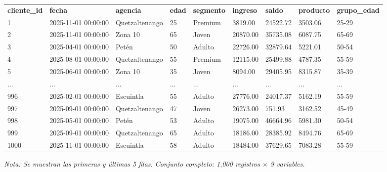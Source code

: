 

\begin{table}[htbp]

\centering

\begin{adjustbox}{max width=\textwidth}

\begin{tabular}{lllllllll}

\rowcolor{ThemeBackground}
\rule{0pt}{0.45cm}
\textcolor{ThemeGold}{\bfseries cliente\_id} & \textcolor{ThemeGold}{\bfseries fecha} & \textcolor{ThemeGold}{\bfseries agencia} & \textcolor{ThemeGold}{\bfseries edad} & \textcolor{ThemeGold}{\bfseries segmento} & \textcolor{ThemeGold}{\bfseries ingreso} & \textcolor{ThemeGold}{\bfseries saldo} & \textcolor{ThemeGold}{\bfseries producto} & \textcolor{ThemeGold}{\bfseries grupo\_edad} \\

1 & 2025-11-01 00:00:00 & Quetzaltenango & 25 & Premium & 3819.00 & 24522.72 & 3503.06 & 25-29 \\
2 & 2025-11-01 00:00:00 & Zona 10 & 65 & Joven & 20870.00 & 35735.08 & 6087.75 & 65-69 \\
3 & 2025-04-01 00:00:00 & Petén & 50 & Adulto & 22726.00 & 32879.64 & 5221.01 & 50-54 \\
4 & 2025-08-01 00:00:00 & Quetzaltenango & 55 & Premium & 12115.00 & 25499.88 & 4787.35 & 55-59 \\
5 & 2025-06-01 00:00:00 & Zona 10 & 35 & Joven & 8094.00 & 29405.95 & 8315.87 & 35-39 \\
... & ... & ... & ... & ... & ... & ... & ... & ... \\
996 & 2025-02-01 00:00:00 & Escuintla & 55 & Adulto & 27776.00 & 24017.37 & 5162.19 & 55-59 \\
997 & 2025-09-01 00:00:00 & Quetzaltenango & 47 & Joven & 26273.00 & 751.93 & 3162.52 & 45-49 \\
998 & 2025-05-01 00:00:00 & Petén & 53 & Adulto & 19075.00 & 46664.96 & 5981.30 & 50-54 \\
999 & 2025-09-01 00:00:00 & Quetzaltenango & 65 & Adulto & 18186.00 & 28385.92 & 8494.76 & 65-69 \\
1000 & 2025-11-01 00:00:00 & Escuintla & 58 & Adulto & 18484.00 & 37629.65 & 7083.28 & 55-59 \\
\bottomrule
\end{tabular}

\end{adjustbox}

\vspace{0.15cm}
{\raggedright\sffamily\footnotesize\color{ThemeMuted}
\textit{Nota: Se muestran las primeras y últimas 5 filas. Conjunto completo: 1,000 registros $\times$ 9 variables.}}

\end{table}
